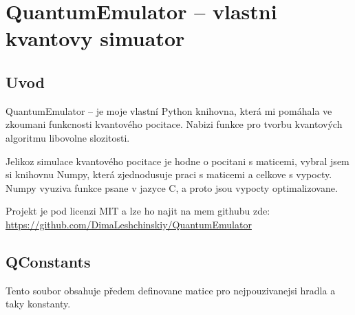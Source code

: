\documentclass[12pt]{article}
\begin{document}
\section{QuantumEmulator – vlastni kvantovy simuator}
\subsection{Uvod}
QuantumEmulator – je moje vlastní Python knihovna, která mi pomáhala ve zkoumani funkcnosti kvantového pocitace.
Nabizi funkce pro tvorbu kvantových algoritmu libovolne slozitosti.
\par Jelikoz simulace kvantového pocitace je hodne o pocitani s maticemi, vybral jsem si knihovnu Numpy, která zjednodusuje praci s maticemi a celkove s vypocty.
Numpy vyuziva funkce psane v jazyce C, a proto jsou vypocty optimalizovane.
\par Projekt je pod licenzi MIT a lze ho najit na mem githubu zde: \url{https://github.com/DimaLeshchinskiy/QuantumEmulator}

\subsection{QConstants}
Tento soubor obsahuje předem definovane matice pro nejpouzivanejsi hradla a taky konstanty.
\end{document}
